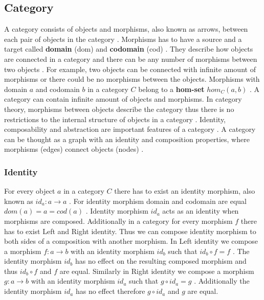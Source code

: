 \documentclass[article]{aaltoseries}
\begin{document}

  \subsection{Category}
  A category consists of objects and morphisms, also known as arrows, between
  each pair of objects in the category \cite{barr1990category,
    mac2013categories}. Morphisms has to have a source and a target called
  \textbf{domain} (dom) and \textbf{codomain} (cod) \cite{awodey2006category,
    barr1990category, mac2013categories}. They describe how objects are
  connected in a category and there can be any number of morphisms between two
  objects \cite{computational, barr1990category}. For example, two objects can
  be connected with infinite amount of morphisms or there could be no morphisms
  between the objects. Morphisms with domain $a$ and codomain $b$ in a category
  $C$ belong to a \textbf{hom-set} $hom_C(a, b)$ \cite{mac2013categories,
    barr1990category}. A category can contain infinite amount of objects and
  morphisms. In category theory, morphisms between objects describe the category
  thus there is no restrictions to the internal structure of objects in a
  category \cite{computational}. Identity, composability and abstraction
  are important features of a category \cite{barr1990category,
    awodey2006category}. A category can be thought as a graph with an identity
  and composition properties, where morphisms (edges) connect objects (nodes)
  \cite{barr1990category}.


  \subsubsection{Identity}
    For every object $a$ in a category $C$ there has to exist an identity
    morphism, also known as $id_a: a \rightarrow a$ \cite{mac2013categories,
      computational}. For identity morphism domain and codomain are equal $dom(a)
    = a = cod(a)$ \cite{mac2013categories}. Identity morphism $id_a$ acts as an
    identity when morphisms are composed. Additionally in a category for every
    morphism $f$ there has to exist Left and Right identity. Thus we can compose
    identity morphism to both sides of a composition with another morphism. In
    Left identity we compose a morphism $f: a \rightarrow b$ with an identity
    morphism $id_b$ such that $id_b \circ f = f$ \cite{computational,
      barr1990category}. The identity morphism $id_b$ has no effect on the
    resulting composed morphism and thus $id_b \circ f$ and $f$ are equal.
    Similarly in Right identity we compose a morphism $g: a \rightarrow b$ with
    an identity morphism $id_a$ such that $g \circ id_a = g$
    \cite{computational, barr1990category}. Additionally the identity morphism
    $id_a$ has no effect therefore $g \circ id_a$ and $g$ are equal.
 
\end{document}
